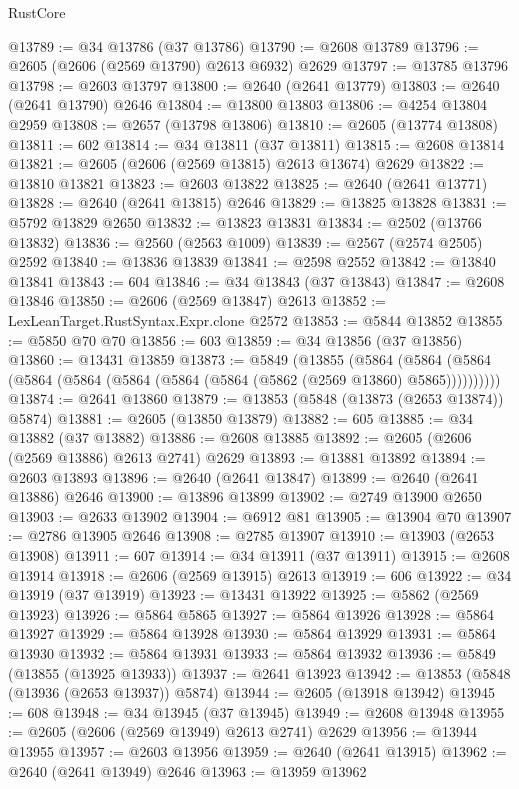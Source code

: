 \begin{lexlean}{RustCore}
\begin{coremodule}
@13789 := @34 @13786 (@37 @13786)
@13790 := @2608 @13789
@13796 := @2605 (@2606 (@2569 @13790) @2613 @6932) @2629
@13797 := @13785 @13796
@13798 := @2603 @13797
@13800 := @2640 (@2641 @13779)
@13803 := @2640 (@2641 @13790) @2646
@13804 := @13800 @13803
@13806 := @4254 @13804 @2959
@13808 := @2657 (@13798 @13806)
@13810 := @2605 (@13774 @13808)
@13811 := 602
@13814 := @34 @13811 (@37 @13811)
@13815 := @2608 @13814
@13821 := @2605 (@2606 (@2569 @13815) @2613 @13674) @2629
@13822 := @13810 @13821
@13823 := @2603 @13822
@13825 := @2640 (@2641 @13771)
@13828 := @2640 (@2641 @13815) @2646
@13829 := @13825 @13828
@13831 := @5792 @13829 @2650
@13832 := @13823 @13831
@13834 := @2502 (@13766 @13832)
@13836 := @2560 (@2563 @1009)
@13839 := @2567 (@2574 @2505) @2592
@13840 := @13836 @13839
@13841 := @2598 @2552
@13842 := @13840 @13841
@13843 := 604
@13846 := @34 @13843 (@37 @13843)
@13847 := @2608 @13846
@13850 := @2606 (@2569 @13847) @2613
@13852 := LexLeanTarget.RustSyntax.Expr.clone @2572
@13853 := @5844 @13852
@13855 := @5850 @70 @70
@13856 := 603
@13859 := @34 @13856 (@37 @13856)
@13860 := @13431 @13859
@13873 := @5849
    (@13855
      (@5864 (@5864 (@5864 (@5864 (@5864 (@5864 (@5864 (@5864 (@5862 (@2569 @13860) @5865))))))))))
@13874 := @2641 @13860
@13879 := @13853 (@5848 (@13873 (@2653 @13874)) @5874)
@13881 := @2605 (@13850 @13879)
@13882 := 605
@13885 := @34 @13882 (@37 @13882)
@13886 := @2608 @13885
@13892 := @2605 (@2606 (@2569 @13886) @2613 @2741) @2629
@13893 := @13881 @13892
@13894 := @2603 @13893
@13896 := @2640 (@2641 @13847)
@13899 := @2640 (@2641 @13886) @2646
@13900 := @13896 @13899
@13902 := @2749 @13900 @2650
@13903 := @2633 @13902
@13904 := @6912 @81
@13905 := @13904 @70
@13907 := @2786 @13905 @2646
@13908 := @2785 @13907
@13910 := @13903 (@2653 @13908)
@13911 := 607
@13914 := @34 @13911 (@37 @13911)
@13915 := @2608 @13914
@13918 := @2606 (@2569 @13915) @2613
@13919 := 606
@13922 := @34 @13919 (@37 @13919)
@13923 := @13431 @13922
@13925 := @5862 (@2569 @13923)
@13926 := @5864 @5865
@13927 := @5864 @13926
@13928 := @5864 @13927
@13929 := @5864 @13928
@13930 := @5864 @13929
@13931 := @5864 @13930
@13932 := @5864 @13931
@13933 := @5864 @13932
@13936 := @5849 (@13855 (@13925 @13933))
@13937 := @2641 @13923
@13942 := @13853 (@5848 (@13936 (@2653 @13937)) @5874)
@13944 := @2605 (@13918 @13942)
@13945 := 608
@13948 := @34 @13945 (@37 @13945)
@13949 := @2608 @13948
@13955 := @2605 (@2606 (@2569 @13949) @2613 @2741) @2629
@13956 := @13944 @13955
@13957 := @2603 @13956
@13959 := @2640 (@2641 @13915)
@13962 := @2640 (@2641 @13949) @2646
@13963 := @13959 @13962

\end{coremodule}
\end{lexlean}
